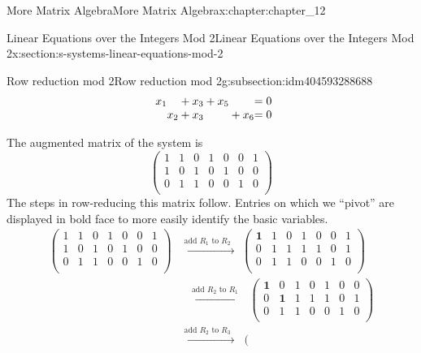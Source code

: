 \documentclass[twoside,10pt,]{book}
\numberwithin{equation}{section}
\begin{document}
\begin{chapterptx}{More Matrix Algebra}{}{More Matrix Algebra}{}{}{x:chapter:chapter_12}
\begin{sectionptx}{Linear Equations over the Integers Mod 2}{}{Linear Equations over the Integers Mod 2}{}{}{x:section:s-systems-linear-equations-mod-2}
\begin{subsectionptx}{Row reduction mod 2}{}{Row reduction mod 2}{}{}{g:subsection:idm404593288688}
\begin{equation*}
\begin{array}{r@{}r@{}r@{}r@{}r@{}r@{}r@{}r@{}r@{}r@{}r@{}r@{}}
x_1 &      &    & {}+{}&x_3 &      &      &{}+{} & x_5&     &   &= 0 \\
&      & x_2& {}+{}&x_3 &      &      &      &    &{}+{}&x_6&= 0 \\
\end{array}
\end{equation*}
%
\par
The augmented  matrix of the  system is%
\begin{equation*}
\left(
\begin{array}{cccccc|c}
1 & 1 & 0 &  1 & 0 & 0 & 1 \\
1 & 0 & 1 &  0 & 1 & 0 & 0 \\
0 & 1 & 1 &  0 & 0 & 1 & 0 \\
\end{array}
\right)
\end{equation*}
The steps in row-reducing this matrix follow.  Entries on which we ``pivot'' are displayed in bold face to more easily identify the basic variables.%
\begin{equation*}
\begin{split}
\left(
\begin{array}{cccccc|c}
1 & 1 & 0 &  1 & 0 & 0 & 1 \\
1 & 0 & 1 &  0 & 1 & 0 & 0 \\
0 & 1 & 1 &  0 & 0 & 1 & 0 \\
\end{array}
\right) & \overset{\textrm{add }R_1\textrm{ to }R_2}{\text{  }\longrightarrow }\text{   }
\left(
\begin{array}{cccccc|c}
\textbf{1} & 1 & 0 &  1 & 0 & 0 & 1 \\
0 & 1 & 1 &  1 & 1 & 0 & 1 \\
0 & 1 & 1 &  0 & 0 & 1 & 0 \\
\end{array}
\right)\\
& \text{         }\overset{\textrm{add }R_2\textrm{ to }R_1}{\text{  }\longrightarrow }\text{    }\left(
\begin{array}{cccccc|c}
\textbf{1} & 0 & 1 &  0 & 1& 0 & 0 \\
0 & \textbf{1} & 1 &  1 & 1 & 0 & 1 \\
0 & 1 & 1 &  0 & 0 & 1 & 0 \\
\end{array}
\right) \\
& \overset{\textrm{add }R_2\textrm{ to }R_3}{\text{  }\longrightarrow }\text{    }
\left(
\begin{array}{cccccc|c}

\end{array}
\end{split}
\end{equation*}
\end{subsectionptx}
\end{sectionptx}
\end{chapterptx}
\end{document}

